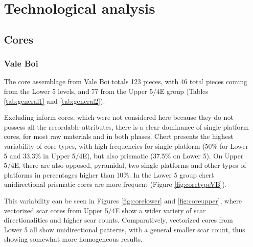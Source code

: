 \documentclass[12pt,twoside]{reedthesis}
\begin{document}
\hypertarget{technological-analysis}{%
\section{Technological analysis}\label{technological-analysis}}

\hypertarget{cores}{%
\subsection{Cores}\label{cores}}

\hypertarget{vale-boi-4}{%
\subsubsection{Vale Boi}\label{vale-boi-4}}

The core assemblage from Vale Boi totals 123 pieces, with 46 total pieces coming from the Lower 5 levels, and 77 from the Upper 5/4E group (Tables \ref{tab:general1} and \ref{tab:general2}).

Excluding inform cores, which were not considered here because they do not possess all the recordable attributes, there is a clear dominance of single platform cores, for most raw materials and in both phases. Chert presents the highest variability of core types, with high frequencies for single platform (50\% for Lower 5 and 33.3\% in Upper 5/4E), but also prismatic (37.5\% on Lower 5). On Upper 5/4E, there are also opposed, pyramidal, two single platforms and other types of platforms in percentages higher than 10\%. In the Lower 5 group chert unidirectional prismatic cores are more frequent (Figure \ref{fig:coretypeVB}).

This variability can be seen in Figures \ref{fig:corelower} and \ref{fig:coreupper}, where vectorized scar cores from Upper 5/4E show a wider variety of scar directionalities and higher scar counts. Comparatively, vectorized cores from Lower 5 all show unidirectional patterns, with a general smaller scar count, thus showing somewhat more homogeneous results.
\end{document}

